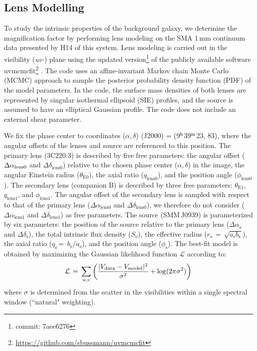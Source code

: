 \documentclass[iop]{emulateapj}
\begin{document}
\subsection{Lens Modelling} \label{sec:Lens}
To study the intrinsic properties of the background galaxy, we determine the magnification factor by performing
lens modeling on the SMA 1\,mm continuum data presented by H14 of this system. Lens modeling is carried out in the visibility
({\it uv-}) plane using the updated version\footnote{commit: 7aee6276} of the publicly available software {\sc uvmcmcfit}\footnote{\url{https://github.com/sbussmann/uvmcmcfit}}
\citep{Bussmann15a}. The code uses an affine-invariant Markov chain Monte Carlo (MCMC) approach to sample the posterior
probability density function (PDF) of the model parameters. In the code, the surface mass densities of both
lenses are represented by singular isothermal ellipsoid (SIE) profiles, and the source is assumed to have an
elliptical Gaussian profile. The code does not include an external shear parameter.

We fix the phase center to coordinates ($\alpha$,\,$\delta$)\,\,(J2000) = (9$^{\rm h}$39$^{\rm m}$23,\,\,83), where the
angular offsets of the lenses and source are referenced to this position. The primary lens (3C220.3) is
described by five free parameters: the angular offset ($\Delta \alpha_{\rm
lens0}$ and $\Delta \delta_\textrm{lens0}$) relative to
the chosen phase center ($\alpha$,\,$\delta$) in the image, the angular Einstein radius ($\theta_\textrm{E0}$), the
axial ratio ($q_\textrm{lens0}$), and the position angle ($\phi_\textrm{lens0}$). The secondary lens (companion B) is
described by three free parameters: $\theta_\textrm{E1}$, $q_\textrm{lens1}$, and $\phi_\textrm{lens1}$. The angular offset
of the secondary
lens is sampled with respect to that of
the primary lens ($\Delta \alpha_\textrm{lens0}$ and $\Delta \delta_\textrm{lens0}$), we therefore do not consider ($\Delta \alpha_\textrm{lens1}$ and $\Delta \delta_\textrm{lens1}$)  as free parameters.
The source (SMM\,J0939) is parameterized by
six parameters: the position of the source relative to the
primary lens ($\Delta \alpha_\textrm{s}$ and $\Delta
\delta_\textrm{s}$), the total intrinsic flux density ($S_\nu$), the
effective radius ($r_\textrm{s}\,=\,\sqrt{a_\textrm{s} b_\textrm{s}}$), the axial
ratio ($q_\textrm{s}$\,=\, $b_\textrm{s}/a_\textrm{s}$), and the position angle
($\phi_\textrm{s}$).
The best-fit model is obtained by maximizing the
Gaussian likelihood function $ \mathcal{L} $ according to:
\begin{equation}
    \mathcal{L}\,=\,\sum_{u, v}\left( \frac{|V_\textrm{data} - V_{\rm
    model}|^2}{\sigma^2} + {\rm log}(2 \pi \sigma^2) \right)
\end{equation}
\noindent where $\sigma$ is determined from the scatter in the visibilities within a
single spectral window (``natural" weighting).
\end{document}
